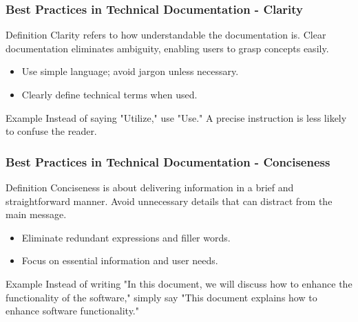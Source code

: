 \documentclass{beamer}
\begin{document}
\begin{frame}[fragile]
    \frametitle{Best Practices in Technical Documentation - Clarity}
    \begin{block}{Definition}
        Clarity refers to how understandable the documentation is. Clear documentation eliminates ambiguity, enabling users to grasp concepts easily.
    \end{block}
    \begin{itemize}
        \item Use simple language; avoid jargon unless necessary.
        \item Clearly define technical terms when used.
    \end{itemize}
    \begin{block}{Example}
        Instead of saying "Utilize," use "Use." A precise instruction is less likely to confuse the reader.
    \end{block}
\end{frame}

\begin{frame}[fragile]
    \frametitle{Best Practices in Technical Documentation - Conciseness}
    \begin{block}{Definition}
        Conciseness is about delivering information in a brief and straightforward manner. Avoid unnecessary details that can distract from the main message.
    \end{block}
    \begin{itemize}
        \item Eliminate redundant expressions and filler words.
        \item Focus on essential information and user needs.
    \end{itemize}
    \begin{block}{Example}
        Instead of writing "In this document, we will discuss how to enhance the functionality of the software," simply say "This document explains how to enhance software functionality."
    \end{block}
\end{frame}
\end{document}
